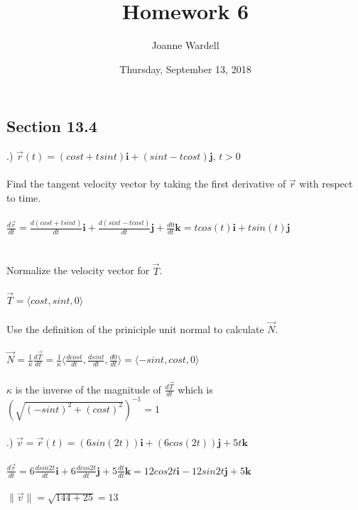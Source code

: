 \documentclass[12pt]{article}
\title{\vspace{-2.0cm}Homework 6}
\author{Joanne Wardell}
\date{Thursday, September 13, 2018}
\begin{document}
\maketitle


\subsection*{Section 13.4}
.) $\vec{r}(t) = (cos{t} + tsin{t})\mathbf{i} + (sin{t} - tcos{t})\mathbf{j}$, \hspace{10pt} $t > 0$\\\\
\noindent Find the tangent velocity vector by taking the first derivative of $\vec{r}$ with respect to time.\\\\
\noindent $\frac{d\vec{r}}{dt} = \frac{d(cos{t} + tsin{t})}{dt}\mathbf{i} + \frac{d(sin{t} - tcos{t})}{dt}\mathbf{j} + \frac{d0}{dt}\mathbf{k}= tcos(t)\mathbf{i} + tsin(t)\mathbf{j}$\\\\\\
\noindent Normalize the velocity vector for $\vec{T}$. \\\\
\noindent $\vec{T} = \langle cos{t}, sin{t}, 0\rangle$\\\\
\noindent Use the definition of the priniciple unit normal to calculate $\vec{N}$.\\\\
\noindent $\vec{N} = \frac{1}{\kappa}\frac{d\vec{T}}{dt} = \frac{1}{\kappa}\langle \frac{dcos{t}}{dt}, \frac{dsin{t}}{dt} , \frac{d0}{dt}\rangle = \langle -sin{t}, cos{t}, 0\rangle$\\\\
\noindent $\kappa$ is the inverse of the  magnitude of $\frac{d\vec{T}}{dt}$ which is $ (\sqrt{(-sin{t})^{2} + (cos{t})^{2}})^{-1} = 1$\\\\
.) $\vec{v} =\vec{r}(t) = (6sin(2t))\mathbf{i} + (6cos(2t))\mathbf{j} + 5t\mathbf{k}$\\\\
\noindent $\frac{d\vec{r}}{dt} = 6\frac{dsin{2t}}{dt}\mathbf{i} + 6\frac{dcos{2t}}{dt}\mathbf{j} + 5\frac{dt}{dt}\mathbf{k} =
12cos{2t}\mathbf{i} - 12sin{2t}\mathbf{j} + 5\mathbf{k}$\\\\
\noindent $\| \vec{v} \| = \sqrt{144 + 25} = 13 $\\\\
\end{document}
